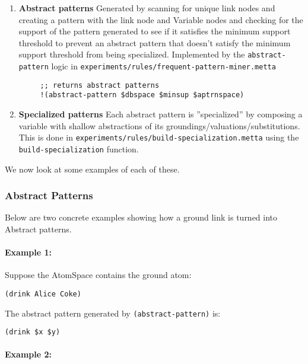 \documentclass{article}
\begin{document}
\begin{enumerate}
  \item \textbf{Abstract patterns}
  Generated by scanning for unique link nodes and creating a pattern with the link node and Variable nodes and checking for the support of the pattern generated to see if it satisfies the minimum support threshold to prevent an abstract pattern that doesn't satisfy the minimum support threshold from being specialized.  Implemented by the \texttt{abstract-pattern} logic in \texttt{experiments/rules/frequent-pattern-miner.metta}
    \begin{verbatim}
     ;; returns abstract patterns
     !(abstract-pattern $dbspace $minsup $aptrnspace)
    \end{verbatim}
  \item \textbf{Specialized patterns}
    Each abstract pattern is ''specialized'' by composing a variable with shallow abstractions of its groundings/valuations/substitutions.  This is done in \texttt{experiments/rules/build-specialization.metta} using the \texttt{build-specialization} function.
\end{enumerate}

We now look at some examples of each of these.

\subsubsection{Abstract Patterns}

Below are two concrete examples showing how a ground link is turned into Abstract patterns.

\paragraph{Example 1:}

Suppose the AtomSpace contains the ground atom:

\begin{verbatim}
(drink Alice Coke)
\end{verbatim}

The abstract pattern generated by \texttt{(abstract-pattern)} is:

\begin{verbatim}
(drink $x $y)
\end{verbatim}

\paragraph{Example 2:}
\end{document}

